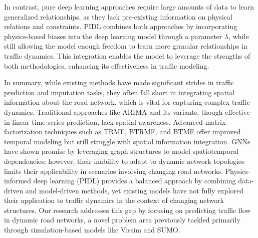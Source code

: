 In contrast, pure deep learning approaches require large amounts of data to learn generalized relationships, as they lack pre-existing information on physical relations and constraints. PIDL combines both approaches by incorporating physics-based biases into the deep learning model through a parameter \(\lambda\), while still allowing the model enough freedom to learn more granular relationships in traffic dynamics. This integration enables the model to leverage the strengths of both methodologies, enhancing its effectiveness in traffic modeling.

In summary, while existing methods have made significant strides in traffic prediction and imputation tasks, they often fall short in integrating spatial information about the road network, which is vital for capturing complex traffic dynamics. Traditional approaches like ARIMA and its variants, though effective in linear time series prediction, lack spatial awareness. Advanced matrix factorization techniques such as TRMF, BTRMF, and BTMF offer improved temporal modeling but still struggle with spatial information integration. GNNs have shown promise by leveraging graph structures to model spatiotemporal dependencies; however, their inability to adapt to dynamic network topologies limits their applicability in scenarios involving changing road networks. Physics-informed deep learning (PIDL) provides a balanced approach by combining data-driven and model-driven methods, yet existing models have not fully explored their application to traffic dynamics in the context of changing network structures. Our research addresses this gap by focusing on predicting traffic flow in dynamic road networks, a novel problem area previously tackled primarily through simulation-based models like Vissim\cite{vissim} and SUMO\cite{sumo}.